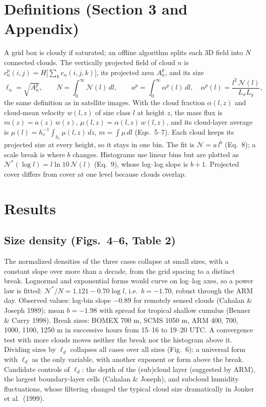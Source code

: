 \documentclass[10pt,a4paper]{article}
\begin{document}
\section{Definitions (Section 3 and Appendix)}
A grid box is cloudy if saturated; an offline algorithm splits each 3D field into $N$ connected clouds. The vertically projected field of cloud $n$ is $c_n^p(i,j)=H\big[\sum_kc_n(i,j,k)\big]$, its projected area $A_n^p$, and its size
\[
 \ell_n=\sqrt{A_n^p},\qquad N=\int_0^\infty\!\mathcal N(l)\,dl,\qquad a^p=\int_0^\infty\!\alpha^p(l)\,dl,\quad \alpha^p(l)=\frac{l^2\,\mathcal N(l)}{L_xL_y},
\]
the same definition as in satellite images. With the cloud fraction $\alpha(l,z)$ and cloud-mean velocity $w(l,z)$ of size class $l$ at height $z$, the mass flux is $m(z)=a(z)\,w(z)$, $\mu(l,z)=\alpha(l,z)\,w(l,z)$, and its cloud-layer average is $\mu(l)=h_c^{-1}\int_{h_c}\mu(l,z)\,dz$, $m=\int\mu\,dl$ (Eqs.\ 5--7). Each cloud keeps its projected size at every height, so it stays in one bin. The fit is $\mathcal N=a\,l^b$ (Eq.\ 8); a scale break is where $b$ changes. Histograms use linear bins but are plotted as $\mathcal N^*(\log l)=l\ln10\,\mathcal N(l)$ (Eq.\ 9), whose log--log slope is $b+1$. Projected cover differs from cover at one level because clouds overlap.

\section{Results}
\subsection{Size density (Figs.\ 4--6, Table 2)} The normalized densities of the three cases collapse at small sizes, with a constant slope over more than a decade, from the grid spacing to a distinct break. Lognormal and exponential forms would curve on log--log axes, so a power law is fitted: $\mathcal N^*/N=1.121-0.70\log l$, i.e.\ $b=-1.70$, robust through the ARM day. Observed values: log-bin slope $-0.89$ for remotely sensed clouds (Cahalan \& Joseph 1989); mean $b=-1.98$ with spread for tropical shallow cumulus (Benner \& Curry 1998). Break sizes: BOMEX 700 m, SCMS \num{1050} m, ARM 400, 700, \num{1000}, \num{1100}, \num{1250} m in successive hours from 15--16 to 19--20 UTC. A convergence test with more clouds moves neither the break nor the histogram above it. Dividing sizes by $\ell_d$ collapses all cases over all sizes (Fig.\ 6): a universal form with $\ell_d$ as the only variable, with another exponent or form above the break. Candidate controls of $\ell_d$: the depth of the (sub)cloud layer (suggested by ARM), the largest boundary-layer cells (Cahalan \& Joseph), and subcloud humidity fluctuations, whose filtering changed the typical cloud size dramatically in Jonker et al.\ (1999).
\end{document}
